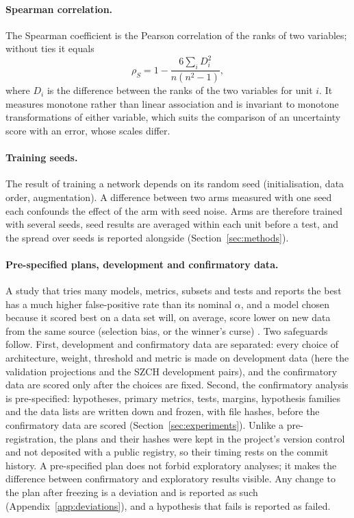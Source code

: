 \paragraph{Spearman correlation.} The Spearman coefficient is the Pearson correlation of the ranks of two variables; without ties it equals
\begin{equation}
\rho_S=1-\frac{6\sum_i D_i^2}{n(n^2-1)},
\label{eq:bg_spearman}
\end{equation}
where $D_i$ is the difference between the ranks of the two variables for unit $i$. It measures monotone rather than linear association and is
invariant to monotone transformations of either variable, which suits the comparison of an uncertainty score with an error, whose scales differ.

\paragraph{Training seeds.} The result of training a network depends on its random seed (initialisation, data order, augmentation). A difference
between two arms measured with one seed each confounds the effect of the arm with seed noise. Arms are therefore trained with several seeds,
seed results are averaged within each unit before a test, and the spread over seeds is reported alongside (Section~\ref{sec:methods}).

\paragraph{Pre-specified plans, development and confirmatory data.} A study that tries many models, metrics, subsets and tests and reports the
best has a much higher false-positive rate than its nominal $\alpha$, and a model chosen because it scored best on a data set will, on average,
score lower on new data from the same source (selection bias, or the winner's curse) \citep{simmons2011falsepositive,varoquaux2022failures}.
Two safeguards follow. First, development and confirmatory data are separated: every choice of architecture, weight, threshold and metric is
made on development data (here the validation projections and the SZCH development pairs), and the confirmatory data are scored only after
the choices are fixed. Second, the confirmatory analysis is pre-specified: hypotheses, primary metrics, tests, margins, hypothesis families and
the data lists are written down and frozen, with file hashes, before the confirmatory data are scored (Section~\ref{sec:experiments}).
Unlike a pre-registration, the plans and their hashes were kept in the project's version control and not deposited with a public registry,
so their timing rests on the commit history. A pre-specified plan does not forbid exploratory analyses; it makes the difference between
confirmatory and exploratory results visible. Any change
to the plan after freezing is a deviation and is reported as such (Appendix~\ref{app:deviations}), and a hypothesis that fails is reported as
failed.


